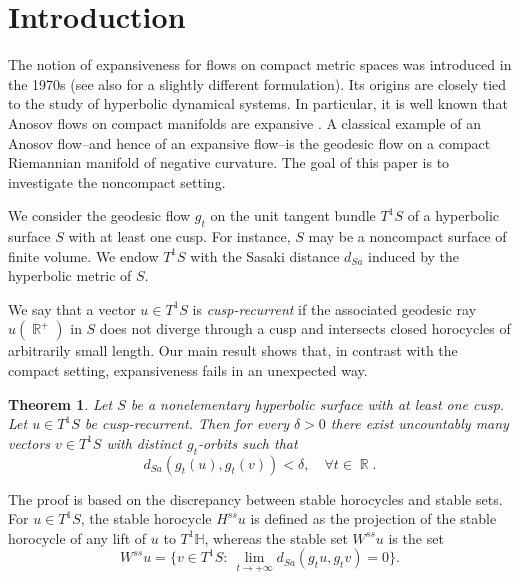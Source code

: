 \documentclass[a4paper,english,reqno]{amsart}
\DeclareMathOperator{\reals}{\mathbb{R}}
\renewcommand{\H}{\mathbb{H}}
\newtheorem{theorem}{Theorem}%
\theoremstyle{definition}
\numberwithin{equation}{section}
\begin{document}
	\maketitle

%	 
	\section{Introduction}
	
	The notion of expansiveness for flows on compact metric spaces was introduced in the 1970s \cite{BowenWalters1972} (see also \cite{KatokHasselblatt1995} for a slightly different formulation). Its origins are closely tied to the study of hyperbolic dynamical systems. In particular, it is well known that Anosov flows on compact manifolds are expansive \cite{Anosov1}. A classical example of an Anosov flow--and hence of an expansive flow--is the geodesic flow on a compact Riemannian manifold of negative curvature. The goal of this paper is to investigate the noncompact setting.


We consider the geodesic flow $g_t$ on the unit tangent bundle $T^1S$ of a hyperbolic surface $S$ with at least one cusp. For instance, $S$ may be a noncompact surface of finite volume. We endow $T^1S$ with the Sasaki distance $d_{Sa}$ induced by the hyperbolic metric of $S$.

We say that a vector $u\in T^1S$ is \emph{cusp-recurrent} if the associated geodesic ray $u(\reals^+)$ in $S$ does not diverge through a cusp and intersects closed horocycles of arbitrarily small length. Our main result shows that, in contrast with the compact setting, expansiveness fails in an unexpected way.

\begin{theorem}\label{thm1}
	Let $S$ be a nonelementary hyperbolic surface with at least one cusp. Let $u\in T^1S$ be cusp-recurrent. Then for every  $\delta>0$ there exist uncountably many vectors $v\in T^1S$ with distinct $g_t$-orbits such that 
	\[
	d_{Sa}(g_t(u),g_t (v)) <\delta, \quad \forall t \in \reals.
	\]
\end{theorem}
	
	The proof is based on the discrepancy between stable horocycles and stable sets. For $u\in T^1 S$, the stable horocycle $H^{ss}u$ is defined as the projection of the stable horocycle of any lift of $u$ to $T^1 \H$, whereas the stable set $W^{ss} u$ is the set
	$$
	W^{ss}u=\{ v\in T^1S:~ \lim_{t\to +\infty} d_{Sa}(g_tu,g_tv)=0 \}.
	$$ 
	
\end{document}
